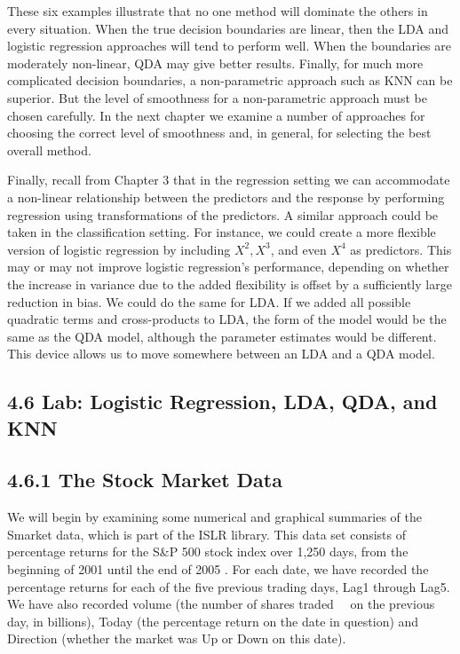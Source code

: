 \documentclass[10pt]{article}
\begin{document}
These six examples illustrate that no one method will dominate the others in every situation. When the true decision boundaries are linear, then the LDA and logistic regression approaches will tend to perform well. When the boundaries are moderately non-linear, QDA may give better results. Finally, for much more complicated decision boundaries, a non-parametric approach such as KNN can be superior. But the level of smoothness for a non-parametric approach must be chosen carefully. In the next chapter we examine a number of approaches for choosing the correct level of smoothness and, in general, for selecting the best overall method.

Finally, recall from Chapter 3 that in the regression setting we can accommodate a non-linear relationship between the predictors and the response by performing regression using transformations of the predictors. A similar approach could be taken in the classification setting. For instance, we could create a more flexible version of logistic regression by including $X^{2}, X^{3}$, and even $X^{4}$ as predictors. This may or may not improve logistic regression's performance, depending on whether the increase in variance due to the added flexibility is offset by a sufficiently large reduction in bias. We could do the same for LDA. If we added all possible quadratic terms and cross-products to LDA, the form of the model would be the same as the QDA model, although the parameter estimates would be different. This device allows us to move somewhere between an LDA and a QDA model.

\subsection*{4.6 Lab: Logistic Regression, LDA, QDA, and KNN}
\subsection*{4.6.1 The Stock Market Data}
We will begin by examining some numerical and graphical summaries of the Smarket data, which is part of the ISLR library. This data set consists of percentage returns for the S\&P 500 stock index over 1,250 days, from the beginning of 2001 until the end of 2005 . For each date, we have recorded the percentage returns for each of the five previous trading days, Lag1 through Lag5. We have also recorded volume (the number of shares traded\
\
on the previous day, in billions), Today (the percentage return on the date in question) and Direction (whether the market was Up or Down on this date).
\end{document}
